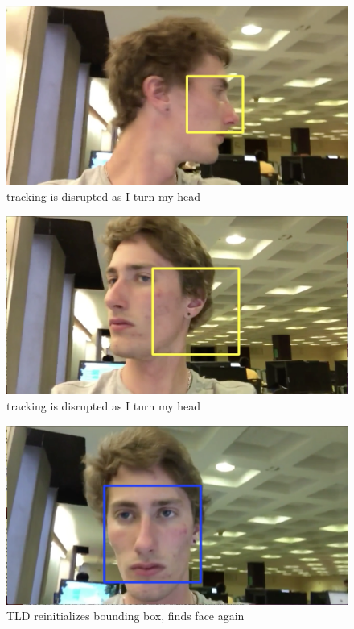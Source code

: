\documentclass[paper=a4, fontsize=11pt]{scrartcl} %
\numberwithin{equation}{section} %
\numberwithin{figure}{section} %
\numberwithin{table}{section} %
\begin{document}
\begin{figure}[H]
  \centering
  \begin{minipage}[b]{0.7\textwidth}
    \includegraphics[width=\textwidth]{tld_2.png}
    \caption{tracking is disrupted as I turn my head}
  \end{minipage}
\end{figure}

\begin{figure}[H]
  \centering
  \begin{minipage}[b]{0.7\textwidth}
    \includegraphics[width=\textwidth]{tld_3.png}
    \caption{tracking is disrupted as I turn my head}
  \end{minipage}
\end{figure}

\begin{figure}[H]
  \centering
  \begin{minipage}[b]{0.7\textwidth}
    \includegraphics[width=\textwidth]{tld_4.png}
    \caption{TLD reinitializes bounding box, finds face again}
  \end{minipage}
\end{figure}
\end{document}
